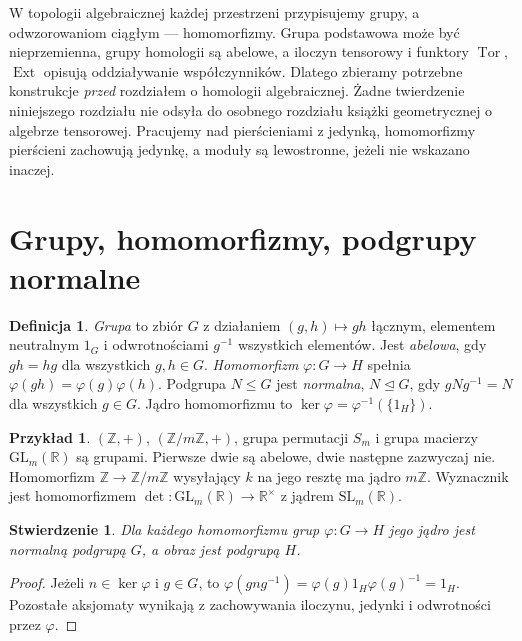 \documentclass[11pt,a4paper,oneside]{report}
\newcommand{\R}{\mathbb{R}}
\newcommand{\Z}{\mathbb{Z}}
\theoremstyle{plain}
\newtheorem{stwierdzenie}[twierdzenie]{Stwierdzenie}
\theoremstyle{definition}
\newtheorem{definicja}[twierdzenie]{Definicja}
\newtheorem{przyklad}[twierdzenie]{Przykład}
\theoremstyle{remark}
\begin{document}
W topologii algebraicznej każdej przestrzeni przypisujemy grupy, a odwzorowaniom
ciągłym --- homomorfizmy. Grupa podstawowa może być nieprzemienna, grupy
homologii są abelowe, a iloczyn tensorowy i funktory $\operatorname{Tor}$,
$\operatorname{Ext}$ opisują oddziaływanie współczynników. Dlatego zbieramy
potrzebne konstrukcje \emph{przed} rozdziałem o homologii algebraicznej.
Żadne twierdzenie niniejszego rozdziału nie odsyła do osobnego rozdziału
książki geometrycznej o algebrze tensorowej. Pracujemy nad pierścieniami
z jedynką, homomorfizmy pierścieni zachowują jedynkę, a moduły są lewostronne,
jeżeli nie wskazano inaczej.

\section{Grupy, homomorfizmy, podgrupy normalne}
\begin{definicja}
\emph{Grupa} to zbiór $G$ z działaniem $(g,h)\mapsto gh$ łącznym,
elementem neutralnym $1_G$ i odwrotnościami $g^{-1}$ wszystkich elementów.
Jest \emph{abelowa}, gdy $gh=hg$ dla wszystkich $g,h\in G$.
\emph{Homomorfizm} $\varphi:G\to H$ spełnia
$\varphi(gh)=\varphi(g)\varphi(h)$. Podgrupa $N\leq G$ jest
\emph{normalna}, $N\trianglelefteq G$, gdy $gNg^{-1}=N$ dla wszystkich
$g\in G$. Jądro homomorfizmu to $\ker\varphi=\varphi^{-1}(\{1_H\})$.
\end{definicja}
\begin{przyklad}
$(\Z,+)$, $(\Z/m\Z,+)$, grupa permutacji $S_m$ i grupa macierzy
$\mathrm{GL}_m(\R)$ są grupami. Pierwsze dwie są abelowe, dwie następne
zazwyczaj nie. Homomorfizm $\Z\to \Z/m\Z$ wysyłający $k$ na jego
resztę ma jądro $m\Z$. Wyznacznik jest homomorfizmem
$\det:\mathrm{GL}_m(\R)\to\R^\times$ z jądrem
$\mathrm{SL}_m(\R)$.
\end{przyklad}
\begin{stwierdzenie}
Dla każdego homomorfizmu grup $\varphi:G\to H$ jego jądro jest
normalną podgrupą $G$, a obraz jest podgrupą $H$.
\end{stwierdzenie}
\begin{proof}
Jeżeli $n\in\ker\varphi$ i $g\in G$, to
$\varphi(gng^{-1})=\varphi(g)1_H\varphi(g)^{-1}=1_H$.
Pozostałe aksjomaty wynikają z zachowywania iloczynu, jedynki
i odwrotności przez $\varphi$.
\end{proof}
\end{document}

